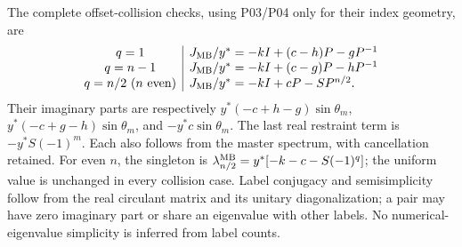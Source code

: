 The complete offset-collision checks, using P03/P04 only for their
index geometry, are
\[
\begin{array}{c|l}
q=1&J_{\mathrm{MB}}/y^*=-kI+(c-h)P-gP^{-1}\\
q=n-1&J_{\mathrm{MB}}/y^*=-kI+(c-g)P-hP^{-1}\\
q=n/2\ (n\text{ even})&J_{\mathrm{MB}}/y^*=-kI+cP-SP^{n/2}.
\end{array}
\]
Their imaginary parts are respectively
$y^*(-c+h-g)\sin\theta_m$, $y^*(-c+g-h)\sin\theta_m$, and
$-y^*c\sin\theta_m$. The last real restraint term is $-y^*S(-1)^m$.
Each also follows from the master spectrum, with cancellation retained.
For even $n$, the singleton is
$\lambda_{n/2}^{\mathrm{MB}}=y^*[-k-c-S(-1)^q]$; the uniform value is
unchanged in every collision case. Label conjugacy and semisimplicity
follow from the real circulant matrix and its unitary diagonalization;
a pair may have zero imaginary part or share an eigenvalue with other
labels. No numerical-eigenvalue simplicity is inferred from label counts.


